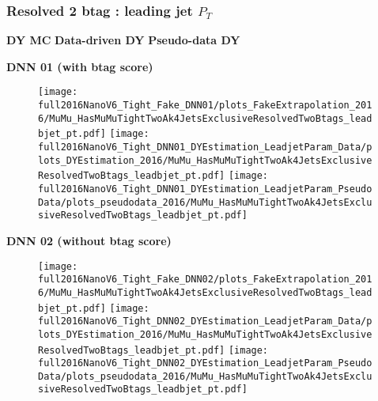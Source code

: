 \documentclass[9pt]{beamer}
\begin{document}
\begin{frame}
	\frametitle{Resolved 2 btag : leading jet $P_T$}
    \hspace{2cm} \textbf{DY MC} \hspace{1.9cm} \textbf{Data-driven DY} \hspace{1cm} \textbf{Pseudo-data DY}
    \begin{center}
        \textbf{DNN 01 (with btag score)}
    \end{center}
	\begin{figure}
		\texttt{[image: full2016NanoV6\_Tight\_Fake\_DNN01/plots\_FakeExtrapolation\_2016/MuMu\_HasMuMuTightTwoAk4JetsExclusiveResolvedTwoBtags\_leadbjet\_pt.pdf]}
		\texttt{[image: full2016NanoV6\_Tight\_DNN01\_DYEstimation\_LeadjetParam\_Data/plots\_DYEstimation\_2016/MuMu\_HasMuMuTightTwoAk4JetsExclusiveResolvedTwoBtags\_leadbjet\_pt.pdf]}
		\texttt{[image: full2016NanoV6\_Tight\_DNN01\_DYEstimation\_LeadjetParam\_PseudoData/plots\_pseudodata\_2016/MuMu\_HasMuMuTightTwoAk4JetsExclusiveResolvedTwoBtags\_leadbjet\_pt.pdf]}
	\end{figure}
    \begin{center}
        \textbf{DNN 02 (without btag score)}
    \end{center}
	\begin{figure}
		\texttt{[image: full2016NanoV6\_Tight\_Fake\_DNN02/plots\_FakeExtrapolation\_2016/MuMu\_HasMuMuTightTwoAk4JetsExclusiveResolvedTwoBtags\_leadbjet\_pt.pdf]}
		\texttt{[image: full2016NanoV6\_Tight\_DNN02\_DYEstimation\_LeadjetParam\_Data/plots\_DYEstimation\_2016/MuMu\_HasMuMuTightTwoAk4JetsExclusiveResolvedTwoBtags\_leadbjet\_pt.pdf]}
		\texttt{[image: full2016NanoV6\_Tight\_DNN02\_DYEstimation\_LeadjetParam\_PseudoData/plots\_pseudodata\_2016/MuMu\_HasMuMuTightTwoAk4JetsExclusiveResolvedTwoBtags\_leadbjet\_pt.pdf]}
	\end{figure}
\end{frame}
\end{document}
